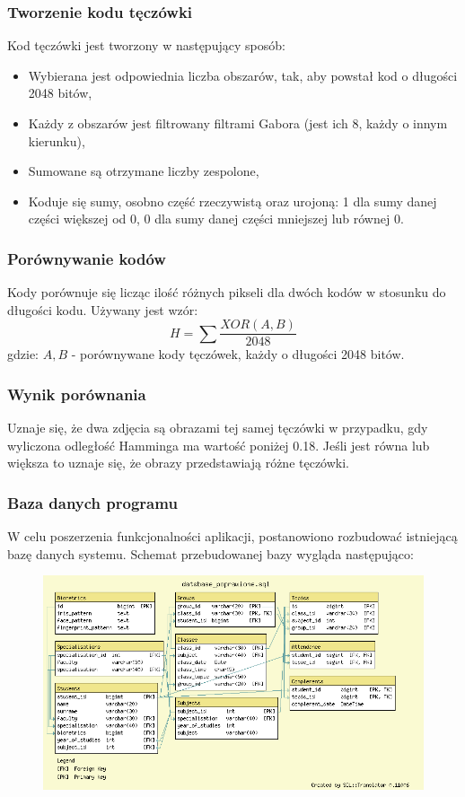 \documentclass{beamer}
\begin{document}
\begin{frame}
\frametitle{Tworzenie kodu tęczówki}
Kod tęczówki jest tworzony w następujący sposób:
\begin{itemize}
\item Wybierana jest odpowiednia liczba obszarów, tak, aby powstał kod o długości 2048 bitów,
\item Każdy z obszarów jest filtrowany filtrami Gabora (jest ich 8, każdy o innym kierunku),
\item Sumowane są otrzymane liczby zespolone,
\item Koduje się sumy, osobno część rzeczywistą oraz urojoną: 1 dla sumy danej części większej od 0, 0 dla sumy danej części mniejszej lub równej 0.
\end{itemize}
\end{frame}


\begin{frame}
\frametitle{Porównywanie kodów}
Kody porównuje się licząc ilość różnych pikseli dla dwóch kodów w stosunku do długości kodu. Używany jest wzór:
$$ H = \sum \frac{XOR(A,B)}{2048} $$
gdzie:
$A, B$ - porównywane kody tęczówek, każdy o długości 2048 bitów.\\
\end{frame}


\begin{frame}
\frametitle{Wynik porównania}
Uznaje się, że dwa zdjęcia są obrazami tej samej tęczówki w przypadku, gdy wyliczona odległość Hamminga ma wartość poniżej 0.18. Jeśli jest równa lub większa to uznaje się, że obrazy przedstawiają różne tęczówki.
\end{frame}

\begin{frame}
\frametitle{Baza danych programu}
W celu poszerzenia funkcjonalności aplikacji, postanowiono rozbudować istniejącą bazę danych systemu. Schemat przebudowanej bazy wygląda następująco:

\begin{figure}
\includegraphics{diagram.png}
\end{figure}
\end{frame}
\end{document}
